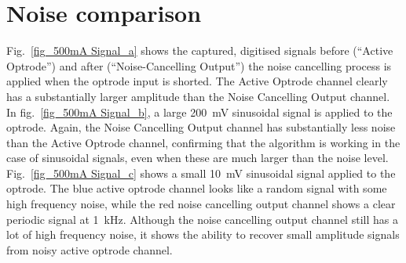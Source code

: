 \section{Noise comparison}

Fig.~\ref{fig_500mA Signal_a} shows the captured, digitised signals before (``Active Optrode'') and after (``Noise-Cancelling Output'') the noise cancelling process is applied when the optrode input is shorted.  The Active Optrode channel clearly has a substantially larger amplitude than the Noise Cancelling Output channel.  In fig.~\ref{fig_500mA Signal_b}, a large \qty{200}{mV} sinusoidal signal is applied to the optrode.  Again, the Noise Cancelling Output channel has substantially less noise than the Active Optrode channel, confirming that the algorithm is working in the case of sinusoidal signals, even when these are much larger than the noise level.  Fig.~\ref{fig_500mA Signal_c} shows a small \qty{10}{mV} sinusoidal signal applied to the optrode.  The blue active optrode channel looks like a random signal with some high frequency noise, while the red noise cancelling output channel shows a clear periodic signal at \qty{1}{kHz}.  Although the noise cancelling output channel still has a lot of high frequency noise, it shows the ability to recover small amplitude signals from noisy active optrode channel.

